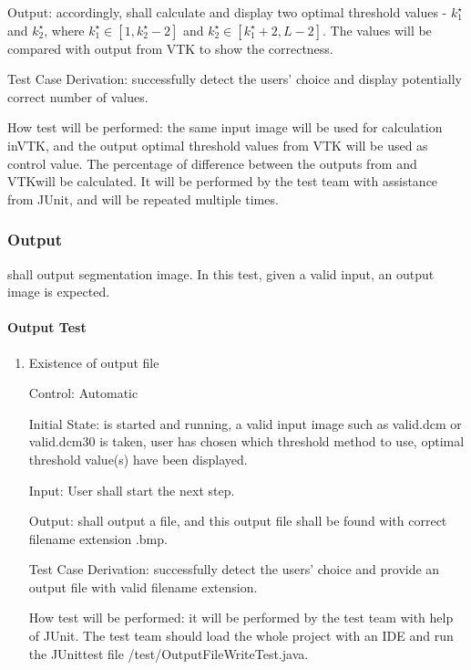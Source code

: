 \documentclass[12pt, titlepage]{article}
\begin{document}
\begin{enumerate}
Output: accordingly, \progname{} shall calculate and display two optimal
threshold values - $k^{\star}_{1}$ and $k^{\star}_{2}$, where $k^{\star}_{1}
\in[1, k^{\star}_{2}-2]$ and $k^{\star}_{2} \in [k^{\star}_{1}+2,L-2]$. The
values
will be compared with output from VTK to show the correctness.

Test Case Derivation: successfully detect the users' choice and display
potentially correct number of values.

How test will be performed: the same input image will be used for calculation
inVTK, and the output optimal threshold values from VTK will be used as control
value. The percentage of difference between the outputs from \progname{} and
VTKwill be calculated. It will be performed by the test team with assistance
from
JUnit, and will be repeated multiple times.

\end{enumerate}

\subsubsection{Output}
\label{sec_outputtest}

\progname{} shall output segmentation image. In this test, given a valid input,
an output image is expected.
		
\paragraph{Output Test}

\begin{enumerate}

\item{Existence of output file}

Control: Automatic
					
Initial State: \progname{} is started and running, a valid input image such as
valid.dcm or valid.dcm30 is taken, user has chosen which threshold method to
use, optimal threshold value(s) have been displayed.
					
Input: User shall start the next step.
					
Output: \progname{} shall output a file, and this output file shall be found
with correct filename extension .bmp.

Test Case Derivation: successfully detect the users' choice and provide an
output file with valid filename extension.

How test will be performed: it will be performed by the test team with help of
JUnit. The test team should load the whole project with an IDE and run the
JUnittest file /test/OutputFileWriteTest.java. 

\end{enumerate}
\end{document}

